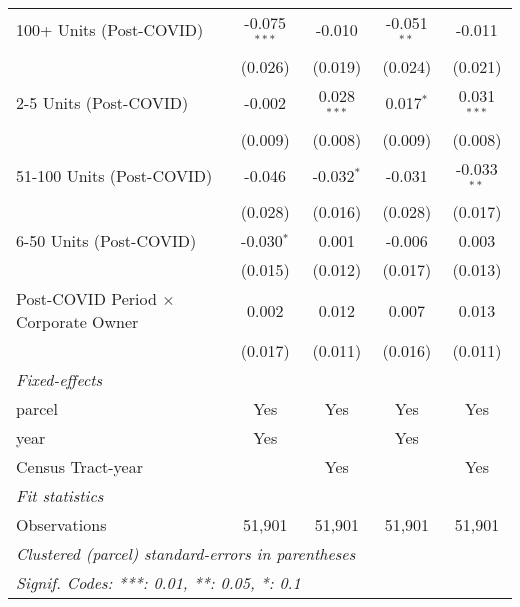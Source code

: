 \begin{table}[htbp]
\begin{tabular}{lcccc}
      100+ Units (Post-COVID)                     & -0.075$^{***}$ & -0.010                              & -0.051$^{**}$             & -0.011\\   
                                                  & (0.026)        & (0.019)                             & (0.024)                   & (0.021)\\   
      2-5 Units (Post-COVID)                      & -0.002         & 0.028$^{***}$                       & 0.017$^{*}$               & 0.031$^{***}$\\   
                                                  & (0.009)        & (0.008)                             & (0.009)                   & (0.008)\\   
      51-100 Units (Post-COVID)                   & -0.046         & -0.032$^{*}$                        & -0.031                    & -0.033$^{**}$\\   
                                                  & (0.028)        & (0.016)                             & (0.028)                   & (0.017)\\   
      6-50 Units (Post-COVID)                     & -0.030$^{*}$   & 0.001                               & -0.006                    & 0.003\\   
                                                  & (0.015)        & (0.012)                             & (0.017)                   & (0.013)\\   
      Post-COVID Period $\times$ Corporate Owner  & 0.002          & 0.012                               & 0.007                     & 0.013\\   
                                                  & (0.017)        & (0.011)                             & (0.016)                   & (0.011)\\   
      \midrule
      \emph{Fixed-effects}\\
      parcel                                      & Yes            & Yes                                 & Yes                       & Yes\\  
      year                                        & Yes            &                                     & Yes                       & \\  
      Census Tract-year                           &                & Yes                                 &                           & Yes\\  
      \midrule
      \emph{Fit statistics}\\
      Observations                                & 51,901         & 51,901                              & 51,901                    & 51,901\\  
      \midrule \midrule
      \multicolumn{5}{l}{\emph{Clustered (parcel) standard-errors in parentheses}}\\
      \multicolumn{5}{l}{\emph{Signif. Codes: ***: 0.01, **: 0.05, *: 0.1}}\\
   \end{tabular}
\end{table}
